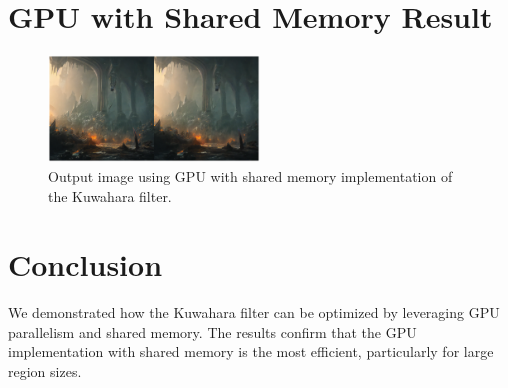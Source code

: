 \documentclass{article}
\begin{document}
\section{GPU with Shared Memory Result}
\begin{figure}[h!]
    \centering
    \includegraphics[width=0.5\textwidth]{src/gpu_shared_memory_result.png} 
    \caption{Output image using GPU with shared memory implementation of the Kuwahara filter.}
\end{figure}



\section{Conclusion}
We demonstrated how the Kuwahara filter can be optimized by leveraging GPU parallelism and shared memory. The results confirm that the GPU implementation with shared memory is the most efficient, particularly for large region sizes.
\end{document}

